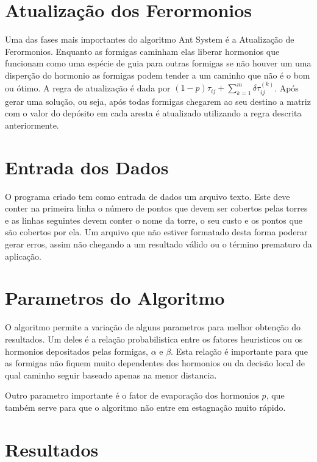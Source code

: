 \documentclass[12pt]{article}
\begin{document}
\section{Atualização dos Ferormonios}

Uma das fases mais importantes do algoritmo Ant System é a Atualização
de Ferormonios. Enquanto as formigas caminham elas liberar hormonios que funcionam
como uma espécie de guia para outras formigas se não houver um uma disperção do hormonio
as formigas podem tender a um caminho que não é o bom ou ótimo. A regra de atualização
é dada por $(1-p)\tau_{ij} + \sum_{k=1}^{m}\delta\tau_{ij}^{(k)}$. Após gerar uma
solução, ou seja, após todas formigas chegarem ao seu destino a matriz com 
o valor do depósito em cada aresta é atualizado utilizando a regra descrita anteriormente.

\section{Entrada dos Dados}

O programa criado tem como entrada de dados um arquivo texto. 
Este deve conter na primeira linha o número de pontos que devem ser cobertos pelas torres e
as linhas seguintes devem conter o nome da torre, o seu custo e os pontos que
são cobertos por ela. Um arquivo que não estiver formatado desta forma poderar
gerar erros, assim não chegando a um resultado válido ou o término prematuro da
aplicação.

\section{Parametros do Algoritmo}

O algoritmo permite a variação de alguns parametros para melhor obtenção do resultados.
Um deles é a relação probabilistica entre os fatores heuristicos ou os hormonios depositados
pelas formigas, $\alpha$ e $\beta$. Esta relação é importante para que as formigas não fiquem
muito dependentes dos hormonios ou da decisão local de qual caminho seguir baseado
apenas na menor distancia.

Outro parametro importante é o fator de evaporação dos hormonios $p$, que também serve
para que o algoritmo não entre em estagnação muito rápido.

\section{Resultados}
\end{document}
